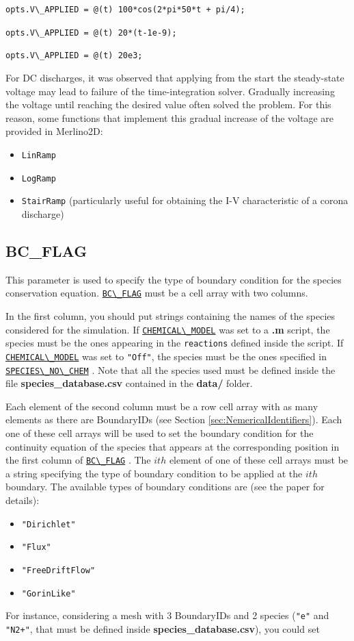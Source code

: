 \documentclass[12pt,a4paper]{article}
\newcommand{\matlabs}[1]{{\lstinline[style=MatlabStyle]!#1!}}
\newcommand{\seclink}[2]{%
	\begingroup
	\hypersetup{linkcolor=orange}%
	\hyperref[sec:#1]{\matlabs{#2}}%
	\endgroup
}
\begin{document}
	\matlabs{opts.V\_APPLIED = @(t) 100*cos(2*pi*50*t + pi/4);}
	
	\matlabs{opts.V\_APPLIED = @(t) 20*(t-1e-9);}
	
	\matlabs{opts.V\_APPLIED = @(t) 20e3;}
	
	\noindent For DC discharges, it was observed that applying from the start the steady-state voltage may lead to failure of the time-integration solver. Gradually increasing the voltage until reaching the desired value often solved the problem. For this reason, some functions that implement this gradual increase of the voltage are provided in Merlino2D:  
	
	\begin{itemize}
		\item \matlabs{LinRamp}
		\item \matlabs{LogRamp}
		\item \matlabs{StairRamp} (particularly useful for obtaining the I-V characteristic of a corona discharge)
	\end{itemize}
	
	\subsection{BC\_FLAG}
	\label{sec:bcflag}
	This parameter is used to specify the type of boundary condition for the species conservation equation.
	\seclink{bcflag}{BC\_FLAG} must be a cell array with two columns. 
	
	In the first column, you should put strings containing the names of the species considered for the simulation. If \seclink{chemicalmodel}{CHEMICAL\_MODEL} was set to a \textbf{.m} script, the species must be the ones appearing in the \matlabs{reactions} defined inside the script.
	If \seclink{chemicalmodel}{CHEMICAL\_MODEL} was set to \matlabs{"Off"}, the species must be the ones specified in \seclink{speciesnochem}{SPECIES\_NO\_CHEM}. Note that all the species used must be defined inside the file \textbf{species\_database.csv} contained in the \textbf{data/} folder.
	
	Each element of the second column must be a row cell array with as many elements as there are BoundaryIDs (see Section \ref{sec:NemericalIdentifiers}). Each one of these cell arrays will be used to set the boundary condition for the continuity equation of the species that appears at the corresponding position in the first column of \seclink{bcflag}{BC\_FLAG}. 
	The $ith$ element of one of these cell arrays must be a string specifying the type of boundary condition to be applied at the $ith$ boundary.
	The available types of boundary conditions are (see the paper for details):
	\begin{itemize}
		\item \matlabs{"Dirichlet"}
		\item \matlabs{"Flux"}
		\item \matlabs{"FreeDriftFlow"}
		\item \matlabs{"GorinLike"}
	\end{itemize}
	For instance, considering a mesh with 3 BoundaryIDs and 2 species (\matlabs{"e"} and \matlabs{"N2+"}, that must be defined inside \textbf{species\_database.csv}), you could set
	
\end{document}
